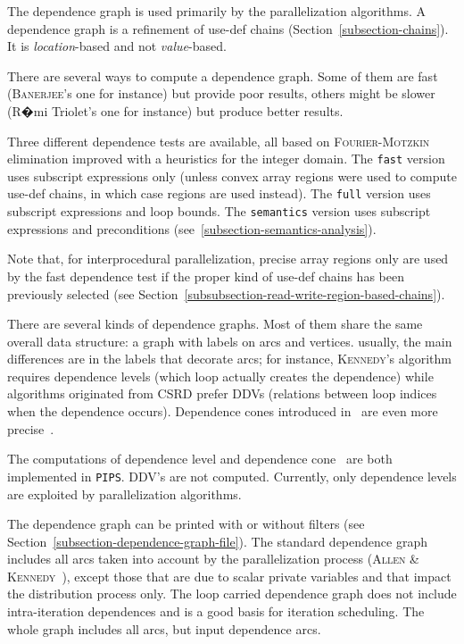 \documentclass[a4paper]{report}
\newenvironment{PipsPass}[1]{\label{pass:#1}}{}
\newcommand{\Pips}{\texttt{PIPS}}
\begin{document}
\begin{PipsPass}{dg}
The dependence graph is used primarily by the parallelization
algorithms. A dependence graph is a refinement of use-def chains
(Section~\ref{subsection-chains}). It is {\em location}-based and not
{\em value}-based.

There are several ways to compute a dependence graph. Some of them are
fast (\textsc{Banerjee}'s one for instance) but provide poor results, others
might be slower (R�mi Triolet's one for instance) but produce better
results.

Three different dependence tests are available, all based on
\textsc{Fourier}-\textsc{Motzkin} elimination improved with a
heuristics for the integer domain. The \verb+fast+ version uses
subscript expressions only (unless convex array regions were used to compute
use-def chains, in which case regions are used instead). The
\verb+full+ version uses subscript expressions and loop bounds. The
\verb+semantics+ version uses subscript expressions and preconditions
(see~\ref{subsection-semantics-analysis}).

Note that, for interprocedural parallelization, precise array regions
only are used by the fast dependence test if the proper kind of
use-def chains has been previously selected (see
Section~\ref{subsubsection-read-write-region-based-chains}).

There are several kinds of dependence graphs. Most of them share the
same overall data structure: a graph with labels on arcs and vertices.
usually, the main differences are in the labels that decorate arcs;
for instance, \textsc{Kennedy}'s algorithm requires dependence levels (which
loop actually creates the dependence) while algorithms originated from
CSRD prefer DDVs (relations between loop indices when the dependence
occurs). Dependence cones introduced in~\cite{Iri87,IT87a,IT87b,IT88}
are even more precise~\cite{YAI94}.

The computations of dependence level and dependence cone~\cite{Yan93} are
both implemented in \Pips{}. DDV's are not computed. Currently, only
dependence levels are exploited by parallelization algorithms.

The dependence graph can be printed with or without filters (see
Section~\ref{subsection-dependence-graph-file}). The standard
dependence graph includes all arcs taken into account by the
parallelization process (\textsc{Allen} \&
\textsc{Kennedy}~\cite{AK87}), except those that are due to scalar
private variables and that impact the distribution process only. The
loop carried dependence graph does not include intra-iteration
dependences and is a good basis for iteration scheduling. The whole
graph includes all arcs, but input dependence arcs.


\end{PipsPass}
\end{document}

